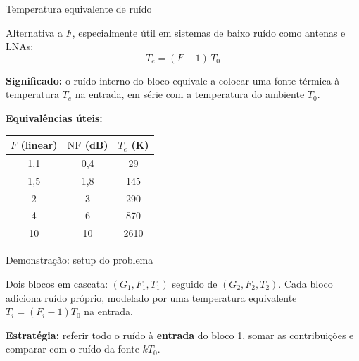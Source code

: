 
\begin{frame}{Temperatura equivalente de ruído}

Alternativa a $F$, especialmente útil em sistemas de baixo ruído como antenas e LNAs:
\[
T_e = (F - 1)\, T_0
\]

\textbf{Significado:} o ruído interno do bloco equivale a colocar uma fonte térmica à temperatura $T_e$ na entrada, em série com a temperatura do ambiente $T_0$.

\vspace{0.3cm}

\textbf{Equivalências úteis:}
\begin{center}
\small
\begin{tabular}{|c|c|c|}
\hline
$F$ (linear) & $\mathrm{NF}$ (dB) & $T_e$ (K) \\
\hline
1{,}1 & 0{,}4 & 29 \\
1{,}5 & 1{,}8 & 145 \\
2 & 3 & 290 \\
4 & 6 & 870 \\
10 & 10 & 2610 \\
\hline
\end{tabular}
\end{center}

\end{frame}


\begin{frame}{Demonstração: setup do problema}

Dois blocos em cascata: $(G_1, F_1, T_1)$ seguido de $(G_2, F_2, T_2)$. Cada bloco adiciona ruído próprio, modelado por uma temperatura equivalente $T_i = (F_i - 1) T_0$ na entrada.

\begin{center}
\end{center}

\textbf{Estratégia:} referir todo o ruído à \textbf{entrada} do bloco 1, somar as contribuições e comparar com o ruído da fonte $kT_0$.

\end{frame}

